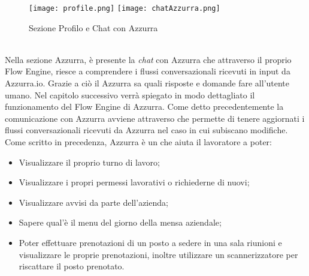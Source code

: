 \begin{trivlist}
	\begin{figure}[h]
		\begin{center}
			\texttt{[image: profile.png]}\hfil
			\texttt{[image: chatAzzurra.png]}
			\caption{Sezione Profilo e Chat con Azzurra}\label{fig:profile}
		\end{center}
	\end{figure}\\
	Nella sezione Azzurra, è presente la \emph{chat}  con Azzurra che attraverso il proprio Flow Engine, riesce a comprendere i flussi conversazionali ricevuti in input da Azzurra.io. Grazie a ciò il  Azzurra sa quali risposte e domande fare all'utente umano. Nel capitolo successivo verrà spiegato in modo dettagliato il funzionamento del Flow Engine di Azzurra. Come detto precedentemente la comunicazione con Azzurra avviene attraverso  che permette di tenere aggiornati i flussi conversazionali ricevuti da Azzurra nel caso in cui subiscano modifiche. Come scritto in precedenza, Azzurra è un  che aiuta il lavoratore a poter:
	\begin{itemize}
		\item Visualizzare il proprio turno di lavoro;
		\item Visualizzare i propri permessi lavorativi o richiederne di nuovi;
		\item Visualizzare avvisi da parte dell'azienda;
		\item Sapere qual'è il menu del giorno della mensa aziendale;
		\item Poter effettuare prenotazioni di un posto a sedere in una sala riunioni e visualizzare le proprie prenotazioni, inoltre utilizzare un scannerizzatore  per riscattare il posto prenotato.
	\end{itemize}
\end{trivlist}	
